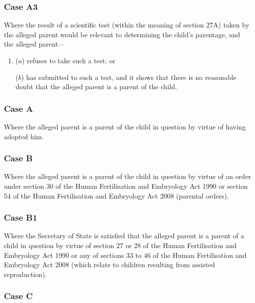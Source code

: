 \documentclass[a4paper]{article}
\begin{document}
\subsubsection*{Case A3}

Where the result of a scientific test (within the meaning of section 27A) taken by the alleged parent would be relevant to determining the child’s parentage, and the alleged parent---
\begin{enumerate}\item[]
($a$)
refuses to take such a test; or

($b$)
has submitted to such a test, and it shows that there is no reasonable doubt that the alleged parent is a parent of the child.
\end{enumerate}

\subsubsection*{Case A}

Where the alleged parent is a parent of the child in question by virtue of having adopted him.

\subsubsection*{Case B}

Where the alleged parent is a parent of the child in question by virtue of an order under section 30 of the Human Fertilisation and Embryology Act 1990 or section 54 of the Human Fertilisation and Embryology Act 2008 (parental orders).

\subsubsection*{Case B1}

Where the Secretary of State is satisfied that the alleged parent is a parent of a child in question by virtue of section 27 or 28 of the Human Fertilisation and Embryology Act 1990 or any of sections 33 to 46 of the Human Fertilisation and Embryology Act 2008 (which relate to children resulting from assisted reproduction).

\subsubsection*{Case C}
\end{document}

